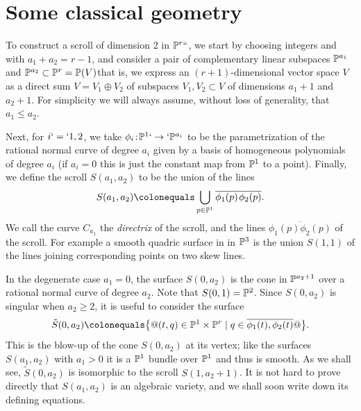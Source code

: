 \section{Some classical geometry}\label{daily name}

To construct a scroll of dimension 2 in ${\mathbb P}^r` `$, we start by choosing
integers 
and  
with $a_1 + a_2 = r-1$, and
consider  a pair of complementary linear subspaces ${\mathbb P}^{a_1}$ and
${\mathbb P}^{a_2} \subset {\mathbb P}^r = {\mathbb P}(V)$\emdash that is, we express an
$(r+1)$-dimensional vector space $V$ as a direct sum $V =  V_1 \oplus
V_2$ of subspaces $V_1, V_2 \subset V$ of dimensions $a_1+1$ and
$a_2+1$. For simplicity we will always assume, without loss of 
generality, that $a_{1}\leq a_{2}$.

Next, for $i`=`1,2$, we take $\phi_i \!:\!  %
\PP^1 `\to` \PP^{a_i}$ to be the
parametrization of the rational normal curve of degree $a_i$ given by
a basis of homogeneous polynom\-ials of degree $a_i$ (if $a_i = 0$ this
is just the constant map from ${\mathbb P}^1$ to a point). Finally, we define
the scroll $S(a_1, a_2)$ to be the union of the lines
\label{thescroll}
$$
S(a_1,a_2)\colonequals\bigcup_{p\in \PP^1} \overline{\phi_1(p)\, \phi_2(p)}.
\vspace*{-2pt}
$$
We call the curve $C_{a_{1}}$ the \emph{directrix} of the scroll, and
%
the lines $ \overline{\phi_1(p) \phi_2(p)}$ 
%
of the scroll. For example a smooth quadric surface in
%
in ${\mathbb P}^3$
is the union $S(1,1)$ of the lines joining corresponding
points on two skew lines.

In the degenerate case $a_{1}= 0$, the surface $S(0,a_{2})$ is the cone
in ${\mathbb P}^{a_{2}+1}$ over a rational normal curve of degree $a_{2}$. Note
that $S(0,1) = {\mathbb P}^{2}$. Since $S(0,a_2)$ is singular when $a_2\geq 2$,
it is useful to consider the surface
$$
\tilde S(0, a_2) \colonequals  \bigl\{@ (t, q) \in \PP^1 \times \PP^r
\mid q \in \overline{\phi_1(t), \phi_2(t)}@\bigr\}.
$$
This is the 
%
blow-up of the cone $S(0, a_2)$ at its vertex; like the
surfaces $S(a_1,a_2)$ with $a_1 > 0$ it is a ${\mathbb P}^1$ bundle over ${\mathbb P}^1$
and thus is smooth. As we shall see, $\tilde S(0, a_2)$ is isomorphic
to the scroll $S(1, a_2+1)$.
It is not hard to prove directly that $S(a_1,a_2)$ is an algebraic
variety, and we shall soon write down its defining equations.

